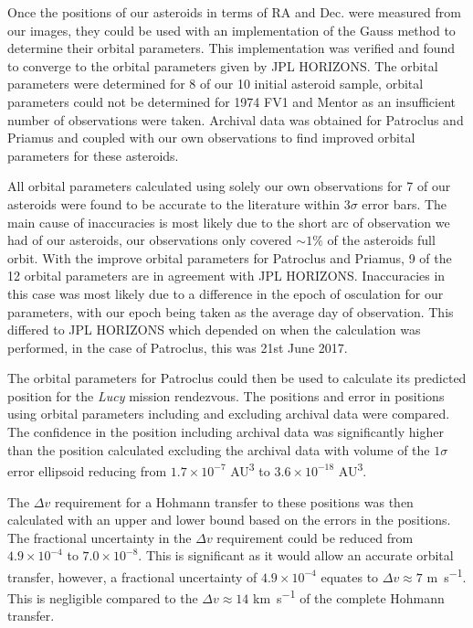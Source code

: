 \documentclass[10pt, twocolumn]{revtex4}    %
\newcommand{\Lucy}{\textit{Lucy }}
\begin{document}
Once the positions of our asteroids in terms of RA and Dec. were measured from our images, they could be used with an implementation of the Gauss method to determine their orbital parameters. This implementation was verified and found to converge to the orbital parameters given by JPL HORIZONS. The orbital parameters were determined for 8 of our 10 initial asteroid sample, orbital parameters could not be determined for 1974 FV1 and Mentor as an insufficient number of observations were taken. Archival data was obtained for Patroclus and Priamus and coupled with our own observations to find improved orbital parameters for these asteroids.

All orbital parameters calculated using solely our own observations for 7 of our asteroids were found to be accurate to the literature within $3\sigma$ error bars. The main cause of inaccuracies is most likely due to the short arc of observation we had of our asteroids, our observations only covered ${\sim}1\%$ of the asteroids full orbit. With the improve orbital parameters for Patroclus and Priamus, 9 of the 12 orbital parameters are in agreement with JPL HORIZONS. Inaccuracies in this case was most likely due to a difference in the epoch of osculation for our parameters, with our epoch being taken as the average day of observation. This differed to JPL HORIZONS which depended on when the calculation was performed, in the case of Patroclus, this was 21st June 2017.

The orbital parameters for Patroclus could then be used to calculate its predicted position for the \Lucy mission rendezvous. The positions and error in positions using orbital parameters including and excluding archival data were compared. The confidence in the position including archival data was significantly higher than the position calculated excluding the archival data with volume of the $1\sigma$ error ellipsoid reducing from $1.7 \times 10^{-7}$ \si{AU^{3}} to $3.6 \times 10^{-18}$ \si{AU\cubed}.

The $\Delta v$ requirement for a Hohmann transfer to these positions was then calculated with an upper and lower bound based on the errors in the positions. The fractional uncertainty in the $\Delta v$ requirement could be reduced from $4.9 \times 10^{-4}$ to $7.0 \times 10^{-8}$. This is significant as it would allow an accurate orbital transfer, however, a fractional uncertainty of $4.9 \times 10^{-4}$ equates to $\Delta v \approx 7$ \si{\metre\per\second}. This is negligible compared to the $\Delta v \approx 14$ \si{\kilo\metre\per\second} of the complete Hohmann transfer.
 
\end{document}
